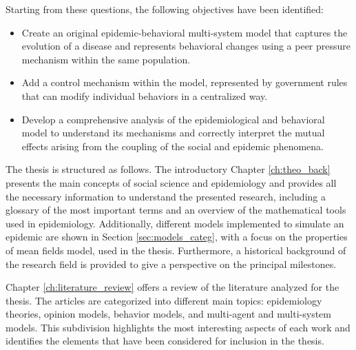 Starting from these questions, the following objectives have been identified:
\begin{itemize}
	\item Create an original epidemic-behavioral multi-system model that captures the evolution of a disease and represents behavioral changes using a peer pressure mechanism within the same population.
	\item Add a control mechanism within the model, represented by government rules that can modify individual behaviors in a centralized way.
	\item Develop a comprehensive analysis of the epidemiological and behavioral model to understand its mechanisms and correctly interpret the mutual effects arising from the coupling of the social and epidemic phenomena.
\end{itemize}
The thesis is structured as follows. The introductory Chapter \ref{ch:theo_back} presents the main concepts of social science and epidemiology and provides all the necessary information to understand the presented research, including a glossary of the most important terms and an overview of the mathematical tools used in epidemiology. Additionally,  different models implemented to simulate an epidemic are shown in Section \ref{sec:models_categ}, with a focus on the properties of mean fields model, used in the thesis. Furthermore, a historical background of the research field is provided to give a perspective on the principal milestones.

Chapter \ref{ch:literature_review} offers a review of the literature analyzed for the thesis. The articles are categorized into different main topics: epidemiology theories, opinion models, behavior models, and multi-agent and multi-system models. This subdivision highlights the most interesting aspects of each work and identifies the elements that have been considered for inclusion in the thesis.

